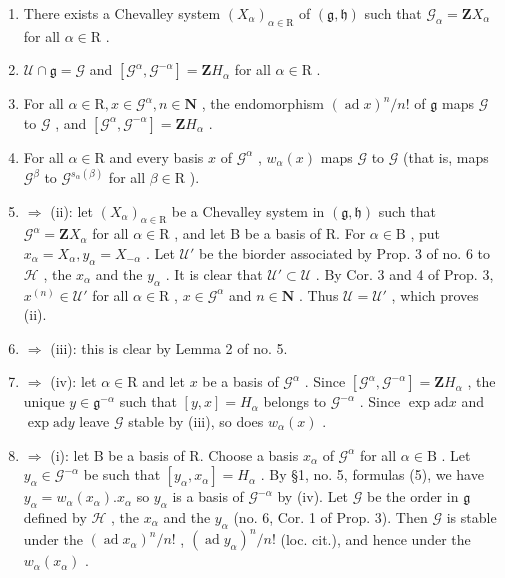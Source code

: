 \begin{enumerate}
\def\labelenumi{(\roman{enumi})}
\item
  There exists a Chevalley system \((X_{\alpha})_{\alpha \in \mathrm{R}}\) of \((\mathfrak{g},\mathfrak{h})\) such that \(\mathcal{G}_{\alpha} = \mathbf{Z}X_{\alpha}\) for all \(\alpha \in \mathrm{R}\) .
\item
  \(\mathcal{U} \cap \mathfrak{g} = \mathcal{G}\) and \([\mathcal{G}^{\alpha}, \mathcal{G}^{-\alpha}] = \mathbf{Z}H_{\alpha}\) for all \(\alpha \in \mathrm{R}\) .
\item
  For all \(\alpha \in \mathrm{R}, x \in \mathcal{G}^{\alpha}, n \in \mathbf{N}\) , the endomorphism \((\operatorname{ad} x)^n / n!\) of \(\mathfrak{g}\) maps \(\mathcal{G}\) to \(\mathcal{G}\) , and \([\mathcal{G}^{\alpha}, \mathcal{G}^{-\alpha}] = \mathbf{Z}H_{\alpha}\) .
\item
  For all \(\alpha \in \mathrm{R}\) and every basis \(x\) of \(\mathcal{G}^{\alpha}\) , \(w_{\alpha}(x)\) maps \(\mathcal{G}\) to \(\mathcal{G}\) (that is, maps \(\mathcal{G}^{\beta}\) to \(\mathcal{G}^{s_{\alpha}(\beta)}\) for all \(\beta \in \mathrm{R}\) ).
\item
  \(\Longrightarrow\) (ii): let \((X_{\alpha})_{\alpha \in \mathrm{R}}\) be a Chevalley system in \((\mathfrak{g},\mathfrak{h})\) such that \(\mathcal{G}^{\alpha} = \mathbf{Z}X_{\alpha}\) for all \(\alpha \in \mathrm{R}\) , and let B be a basis of R. For \(\alpha \in \mathrm{B}\) , put \(x_{\alpha} = X_{\alpha},y_{\alpha} = X_{-\alpha}\) . Let \(\mathcal{U}'\) be the biorder associated by Prop. 3 of no. 6 to \(\mathcal{H}\) , the \(x_{\alpha}\) and the \(y_{\alpha}\) . It is clear that \(\mathcal{U}' \subset \mathcal{U}\) . By Cor. 3 and 4 of Prop. 3, \(x^{(n)} \in \mathcal{U}'\) for all \(\alpha \in \mathrm{R}\) , \(x \in \mathcal{G}^{\alpha}\) and \(n \in \mathbf{N}\) . Thus \(\mathcal{U} = \mathcal{U}'\) , which proves (ii).
\item
  \(\Longrightarrow\) (iii): this is clear by Lemma 2 of no. 5.
\item
  \(\Longrightarrow\) (iv): let \(\alpha \in \mathrm{R}\) and let \(x\) be a basis of \(\mathcal{G}^{\alpha}\) . Since \([\mathcal{G}^{\alpha},\mathcal{G}^{-\alpha}] = \mathbf{Z}H_{\alpha}\) , the unique \(y \in \mathfrak{g}^{-\alpha}\) such that \([y,x] = H_{\alpha}\) belongs to \(\mathcal{G}^{-\alpha}\) . Since \(\exp \mathrm{ad} x\) and \(\exp \mathrm{ad} y\) leave \(\mathcal{G}\) stable by (iii), so does \(w_{\alpha}(x)\) .
\item
  \(\Longrightarrow\) (i): let B be a basis of R. Choose a basis \(x_{\alpha}\) of \(\mathcal{G}^{\alpha}\) for all \(\alpha \in \mathrm{B}\) . Let \(y_{\alpha} \in \mathcal{G}^{-\alpha}\) be such that \([y_{\alpha}, x_{\alpha}] = H_{\alpha}\) . By §1, no. 5, formulas (5), we have \(y_{\alpha} = w_{\alpha}(x_{\alpha}). x_{\alpha}\) so \(y_{\alpha}\) is a basis of \(\mathcal{G}^{-\alpha}\) by (iv). Let \(\mathcal{G}\) be the order in \(\mathfrak{g}\) defined by \(\mathcal{H}\) , the \(x_{\alpha}\) and the \(y_{\alpha}\) (no. 6, Cor. 1 of Prop. 3). Then \(\mathcal{G}\) is stable under the \((\operatorname{ad} x_{\alpha})^{n} / n!\) , \((\operatorname{ad} y_{\alpha})^{n} / n!\) (loc. cit.), and hence under the \(w_{\alpha}(x_{\alpha})\) .

\end{enumerate}
